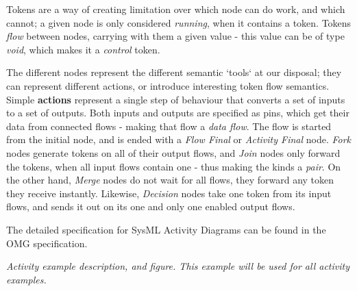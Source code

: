 Tokens are a way of creating limitation over which node can do work, and which cannot; a given node is only considered \emph{running}, when it contains a token. Tokens \emph{flow} between nodes, carrying with them a given value - this value can be of type \emph{void}, which makes it a \emph{control} token.

The different nodes represent the different semantic `tools` at our disposal; they can represent different actions, or introduce interesting token flow semantics.
Simple \textbf{actions} represent a single step of behaviour that converts a set of inputs to a set of outputs. Both inputs and outputs are specified as pins, which get their data from connected flows - making that flow a \emph{data flow}. The flow is started from the initial node, and is ended with a \emph{Flow Final} or \emph{Activity Final} node. \emph{Fork} nodes generate tokens on all of their output flows, and \emph{Join} nodes only forward the tokens, when all input flows contain one - thus making the kinds a \emph{pair}. On the other hand, \emph{Merge} nodes do not wait for all flows, they forward any token they receive instantly. Likewise, \emph{Decision} nodes take one token from its input flows, and sends it out on its one and only one enabled output flows.

The detailed specification for SysML Activity Diagrams can be found in the OMG specification\cite{omg_sysml}.

\textit{Activity example description, and figure. This example will be used for all activity examples.}

